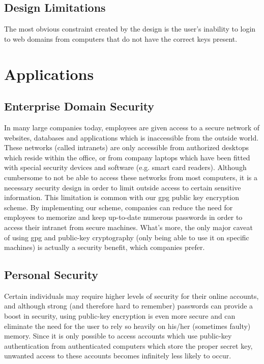 \documentclass[11pt]{article}
\begin{document}
\subsection{Design Limitations}
The most obvious constraint created by the design is the user's inability to login to web domains from computers that do not have the correct keys present.  

\section{Applications} \label{sec:applications}
\subsection{Enterprise Domain Security} \label{subsec:enterprisedomainsecurity}
In many large companies today, employees are given access to a secure network of websites, databases and applications which is inaccessible from the outside world.  These networks (called intranets) are only accessible from authorized desktops which reside within the office, or from company laptops which have been fitted with special security devices and software (e.g. smart card readers).  Although cumbersome to not be able to access these networks from most computers, it is a necessary security design in order to limit outside access to certain sensitive information.  This limitation is common with our gpg public key encryption scheme.  By implementing our scheme, companies can reduce the need for employees to memorize and keep up-to-date numerous passwords in order to access their intranet from secure machines.  What's more, the only major caveat of using gpg and public-key cryptography (only being able to use it on specific machines) is actually a security benefit, which companies prefer.

\subsection{Personal Security} \label{subsec:personalsecurity}
Certain individuals may require higher levels of security for their online accounts, and although strong (and therefore hard to remember) passwords can provide a boost in security, using public-key encryption is even more secure and can eliminate the need for the user to rely so heavily on his/her (sometimes faulty) memory.  Since it is only possible to access accounts which use public-key authentication from authenticated computers which store the proper secret key, unwanted access to these accounts becomes infinitely less likely to occur.
\end{document}
